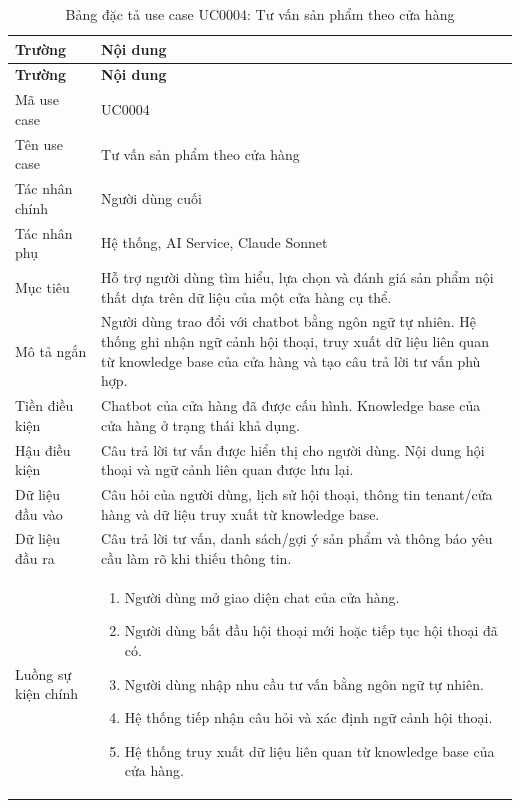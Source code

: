 \documentclass[../DoAn.tex]{subfiles}
\begin{document}
\begin{longtable}{|p{}|p{}|}
\caption{Bảng đặc tả use case UC0004: Tư vấn sản phẩm theo cửa hàng}
\label{table:UC0004} \\
\hline
\textbf{Trường} & \textbf{Nội dung} \\
\hline
\endfirsthead

\hline
\textbf{Trường} & \textbf{Nội dung} \\
\hline
\endhead

Mã use case & UC0004 \\
\hline
Tên use case & Tư vấn sản phẩm theo cửa hàng \\
\hline
Tác nhân chính & Người dùng cuối \\
\hline
Tác nhân phụ & Hệ thống, AI Service, Claude Sonnet \\
\hline
Mục tiêu & Hỗ trợ người dùng tìm hiểu, lựa chọn và đánh giá sản phẩm nội thất dựa trên dữ liệu của một cửa hàng cụ thể. \\
\hline
Mô tả ngắn & Người dùng trao đổi với chatbot bằng ngôn ngữ tự nhiên. Hệ thống ghi nhận ngữ cảnh hội thoại, truy xuất dữ liệu liên quan từ knowledge base của cửa hàng và tạo câu trả lời tư vấn phù hợp. \\
\hline
Tiền điều kiện & Chatbot của cửa hàng đã được cấu hình. Knowledge base của cửa hàng ở trạng thái khả dụng. \\
\hline
Hậu điều kiện & Câu trả lời tư vấn được hiển thị cho người dùng. Nội dung hội thoại và ngữ cảnh liên quan được lưu lại. \\
\hline
Dữ liệu đầu vào & Câu hỏi của người dùng, lịch sử hội thoại, thông tin tenant/cửa hàng và dữ liệu truy xuất từ knowledge base. \\
\hline
Dữ liệu đầu ra & Câu trả lời tư vấn, danh sách/gợi ý sản phẩm và thông báo yêu cầu làm rõ khi thiếu thông tin. \\
\hline
Luồng sự kiện chính &
\begin{minipage}[t]{0.68\textwidth}
\begin{enumerate}
    \item Người dùng mở giao diện chat của cửa hàng.
    \item Người dùng bắt đầu hội thoại mới hoặc tiếp tục hội thoại đã có.
    \item Người dùng nhập nhu cầu tư vấn bằng ngôn ngữ tự nhiên.
    \item Hệ thống tiếp nhận câu hỏi và xác định ngữ cảnh hội thoại.
    \item Hệ thống truy xuất dữ liệu liên quan từ knowledge base của cửa hàng.

\end{enumerate}
\end{minipage}
\end{longtable}
\end{document}
